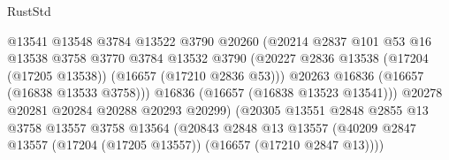 \begin{lexlean}{RustStd}
\begin{coremodule}
                                          @13541
                                          @13548
                                          @3784
                                          @13522
                                          @3790
                                          @20260
                                          (@20214
                                            @2837
                                            @101
                                            @53
                                            @16
                                            @13538
                                            @3758
                                            @3770
                                            @3784
                                            @13532
                                            @3790
                                            (@20227
                                              @2836
                                              @13538
                                              (@17204 (@17205 @13538))
                                              (@16657 (@17210 @2836 @53)))
                                            @20263
                                            @16836
                                            (@16657 (@16838 @13533 @3758)))
                                          @16836
                                          (@16657 (@16838 @13523 @13541)))
                                        @20278
                                        @20281
                                        @20284
                                        @20288
                                        @20293
                                        @20299)
                                      (@20305
                                        @13551
                                        @2848
                                        @2855
                                        @13
                                        @3758
                                        @13557
                                        @3758
                                        @13564
                                        (@20843
                                          @2848
                                          @13
                                          @13557
                                          (@40209
                                            @2847
                                            @13557
                                            (@17204 (@17205 @13557))
                                            (@16657 (@17210 @2847 @13))))

\end{coremodule}
\end{lexlean}
